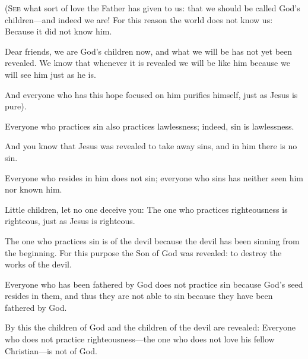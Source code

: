 \begin{scripture}
 \allowchapbreak\hypertarget{ch-1john-3}{}(\lettrine[lines=5]{\color{general}S}{\textsc{ee}} what sort of love the Father has given to us: that we should be called God's children---and indeed we are! For this reason the world does not know us: Because it did not know him.\everypar{}
 Dear friends, we are God's children now, and what we will be has not yet been revealed. We know that whenever it is revealed we will be like him because we will see him just as he is.
 And everyone who has this hope focused on him purifies himself, just as Jesus is pure).
\everypar{}

 Everyone who practices sin also practices lawlessness; indeed, sin is lawlessness.
 And you know that Jesus was revealed to take away sins, and in him there is no sin.
 Everyone who resides in him does not sin; everyone who sins has neither seen him nor known him.
 Little children, let no one deceive you: The one who practices righteousness is righteous, just as Jesus is righteous.
 The one who practices sin is of the devil because the devil has been sinning from the beginning. For this purpose the Son of God was revealed: to destroy the works of the devil.
 Everyone who has been fathered by God does not practice sin because God's seed resides in them, and thus they are not able to sin because they have been fathered by God.
 By this the children of God and the children of the devil are revealed: Everyone who does not practice righteousness---the one who does not love his fellow Christian---is not of God.
\everypar{}


\end{scripture}
